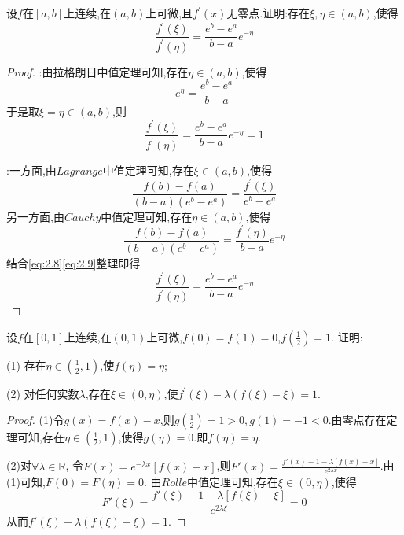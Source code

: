 \documentclass[lang=cn,newtx,10pt,scheme=chinese]{../Template/elegantbook}
\begin{document}
\begin{exercise}
    设\(f\)在\([a,b]\)上连续,在\((a,b)\)上可微,且\(f^{\prime}(x)\)无零点.证明:存在\(\xi,\eta\in(a,b)\),使得
    \begin{equation}
        \frac{f^{\prime}(\xi)}{f^{\prime}(\eta)}=\frac{e^{b}-e^{a}}{b - a}e^{-\eta}
    \nonumber
    \end{equation}
    \begin{proof}
        {\color{blue} }:由拉格朗日中值定理可知,存在$\eta\in(a,b)$,使得
    \begin{equation}
        e^{\eta}=\frac{e^b-e^a}{b-a}
        \nonumber
    \end{equation}
    于是取$\xi=\eta\in(a,b)$,则
    \begin{equation}
        \frac{f^{\prime}(\xi )}{f^{\prime}(\eta )}=\frac{e^b-e^a}{b-a}e^{-\eta}=1
        \nonumber
    \end{equation}

    {\color{blue} }:一方面,由$Lagrange$中值定理可知,存在$\xi \in(a,b)$,使得
    \begin{equation}\label{eq:2.8}
        \frac{f(b)-f\left( a \right)}{\left( b-a \right) \left( e^b-e^a \right)}=\frac{f^{\prime}(\xi )}{e^b-e^a}
    \end{equation}
    另一方面,由$Cauchy$中值定理可知,存在$\eta \in(a,b)$,使得
    \begin{equation}\label{eq:2.9}
        \frac{f(b)-f\left( a \right)}{\left( b-a \right) \left( e^b-e^a \right)}=\frac{f^{\prime}(\eta )}{b-a}e^{-\eta}
    \end{equation}
    结合\eqref{eq:2.8}\eqref{eq:2.9}整理即得
    \begin{equation}
        \frac{f^{\prime}(\xi )}{f^{\prime}(\eta )}=\frac{e^b-e^a}{b-a}e^{-\eta}
    \end{equation}
    \end{proof}
\end{exercise}

\begin{exercise}
    设\(f\)在\([0,1]\)上连续,在\((0,1)\)上可微,\(f(0)=f(1)=0\),\(f(\frac{1}{2})=1\).
    证明:
    
    (1) 存在\(\eta\in(\frac{1}{2},1)\),使\(f(\eta)=\eta\);
    
    (2) 对任何实数\(\lambda\),存在\(\xi\in(0,\eta)\),使\(f^{\prime}(\xi)-\lambda(f(\xi)-\xi)=1\).
    \begin{proof}
    (1)令$g(x)=f(x)-x$,则$g(\frac{1}{2})=1>0,g(1)=-1<0$.由零点存在定理可知,存在$\eta\in(\frac{1}{2},1)$,使得$g(\eta)=0$.即$f(\eta)=\eta$.

    (2)对$\forall \lambda\in \mathbb{R}$,
    令$F(x)=e^{-\lambda x}[f(x)-x]$,则$F'(x)=\frac{f'(x)-1-\lambda[f(x)-x]}{e^{2\lambda x}}$.由(1)可知,$F(0)=F(\eta)=0$.
    由$Rolle$中值定理可知,存在$\xi\in(0,\eta)$,使得
    \begin{equation}
    F'(\xi)=\frac{f'(\xi)-1-\lambda[f(\xi)-\xi]}{e^{2\lambda \xi}}=0
        \nonumber
    \end{equation}
    从而$f'(\xi)-\lambda(f(\xi)-\xi)=1$.
    \end{proof}
\end{exercise}
\end{document}
